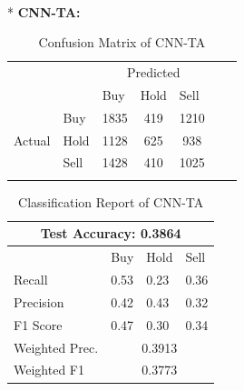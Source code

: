 \documentclass[]{article}
\begin{document}
\vspace{0.2cm}\\*
\textbf{CNN-TA:}
\begin{table}[H]
    \centering
    \caption{Confusion Matrix of CNN-TA}
    \begin{tabular}{llcccll}
        \cline{1-5}
        \multicolumn{1}{|l|}{} & \multicolumn{1}{l|}{} & \multicolumn{3}{c|}{Predicted} & & \\\cline{1-5} \multicolumn{1}{|l|}{} & \multicolumn{1}{l|}{} & \multicolumn{1}{l|}{Buy} & \multicolumn{1}{l|}{Hold} & \multicolumn{1}{l|}{Sell} & & \\\cline{1-5} \multicolumn{1}{|c|}{\multirow{3}{*}{Actual}} & \multicolumn{1}{l|}{Buy} & \multicolumn{1}{c|}{1835} & \multicolumn{1}{c|}{419} & \multicolumn{1}{c|}{1210} & & \\\cline{2-5} \multicolumn{1}{|c|}{} & \multicolumn{1}{l|}{Hold} & \multicolumn{1}{c|}{1128} & \multicolumn{1}{c|}{625} & \multicolumn{1}{c|}{938} & & \\\cline{2-5} \multicolumn{1}{|c|}{} & \multicolumn{1}{l|}{Sell} & \multicolumn{1}{c|}{1428} & \multicolumn{1}{c|}{410} & \multicolumn{1}{c|}{1025} & & \\\cline{1-5} & & \multicolumn{1}{l}{} & \multicolumn{1}{l}{} & \multicolumn{1}{l}{} & & 
    \end{tabular}
\end{table}
\begin{table}[H]
\centering
\caption{Classification Report of CNN-TA}
\begin{tabular}{|llll|}
\hline
\multicolumn{4}{|c|}{Test Accuracy: 0.3864}                                                         \\ \hline
\multicolumn{1}{|l|}{}               & \multicolumn{1}{l|}{Buy}  & \multicolumn{1}{l|}{Hold} & Sell \\ \hline
\multicolumn{1}{|l|}{Recall}         & \multicolumn{1}{l|}{0.53} & \multicolumn{1}{l|}{0.23} & 0.36 \\ \hline
\multicolumn{1}{|l|}{Precision}      & \multicolumn{1}{l|}{0.42} & \multicolumn{1}{l|}{0.43} & 0.32 \\ \hline
\multicolumn{1}{|l|}{F1 Score}       & \multicolumn{1}{l|}{0.47} & \multicolumn{1}{l|}{0.30} & 0.34 \\ \hline
\multicolumn{1}{|l|}{Weighted Prec.} & \multicolumn{3}{c|}{0.3913}                                  \\ \hline
\multicolumn{1}{|l|}{Weighted F1}    & \multicolumn{3}{c|}{0.3773}                                  \\ \hline
\end{tabular}
\end{table}
\end{document}
